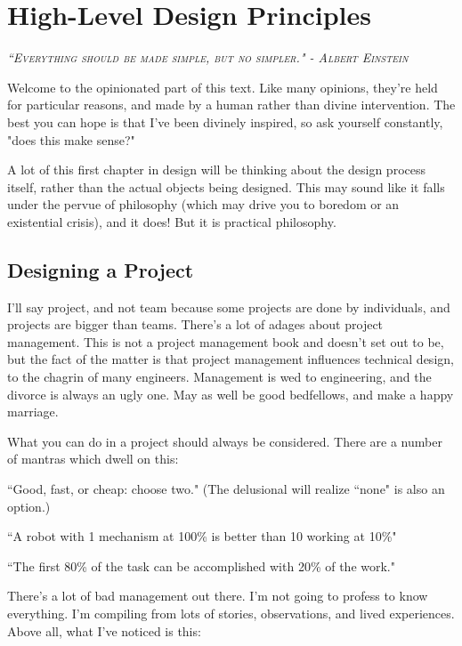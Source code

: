 \chapter{High-Level Design Principles}
 
 {\slshape \scshape ``Everything should be made simple, but no simpler." - Albert Einstein}

Welcome to the opinionated part of this text. Like many opinions, they're held for particular reasons, and made by a human rather than divine intervention. The best you can hope is that I've been divinely inspired, so ask yourself constantly, "does this make sense?"

A lot of this first chapter in design will be thinking about the design process itself, rather than the actual objects being designed. This may sound like it falls under the pervue of philosophy (which may drive you to boredom or an existential crisis), and it does! But it is practical philosophy.

\section{Designing a Project}

I'll say project, and not team because some projects are done by individuals, and projects are bigger than teams. There's a lot of adages about project management. This is not a project management book and doesn't set out to be, but the fact of the matter is that project management influences technical design, to the chagrin of many engineers. Management is wed to engineering, and the divorce is always an ugly one. May as well be good bedfellows, and make a happy marriage.

What you can do in a project should always be considered. There are a number of mantras which dwell on this:

\begin{asparaitem}
	\item ``Good, fast, or cheap: choose two." (The delusional will realize ``none" is also an option.)
	\item ``A robot with 1 mechanism at 100\% is better than 10 working at 10\%"
	\item ``The first 80\% of the task can be accomplished with 20\% of the work."
\end{asparaitem}

There's a lot of bad management out there. I'm not going to profess to know everything. I'm compiling from lots of stories, observations, and lived experiences. Above all, what I've noticed is this:


